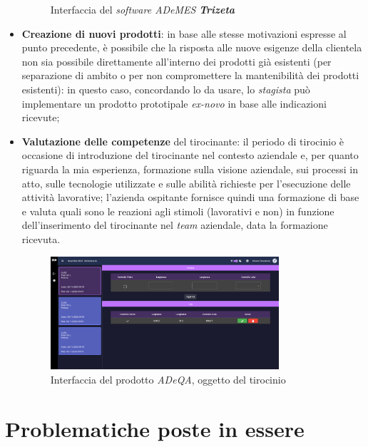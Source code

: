\begin{itemize}
\begin{figure}[H]
            \vspace{-20mm}
            \caption[Interfaccia del \textit{software ADeMES}]{Interfaccia del \textit{software ADeMES} \textit{\textbf{Trizeta}}\footnotemark}
        \end{figure}
    \item \textbf{Creazione di nuovi prodotti}: in base alle stesse motivazioni espresse al punto precedente, è possibile che la risposta alle nuove esigenze della clientela non sia possibile direttamente all'interno dei prodotti già esistenti (per separazione di ambito o
        per non compromettere la mantenibilità dei prodotti esistenti): in questo caso, concordando lo  da usare, lo \textit{stagista} può implementare un prodotto prototipale \textit{ex-novo} in base alle indicazioni ricevute;
    \item \textbf{Valutazione delle competenze} del tirocinante: il periodo di tirocinio è occasione di introduzione del tirocinante nel contesto aziendale e, per quanto riguarda la mia esperienza, formazione sulla visione aziendale, sui processi in atto, sulle tecnologie utilizzate
        e sulle abilità richieste per l'esecuzione delle attività lavorative; l'azienda ospitante fornisce quindi una formazione di base e valuta quali sono le reazioni agli stimoli (lavorativi e non) in funzione dell'inserimento del tirocinante nel \textit{team} aziendale, data la formazione ricevuta.
        \begin{figure}[H]
            \centering
            \includegraphics[width=0.8\textwidth]{images/dashboard.png}
            \caption[Interfaccia del prodotto \textit{ADeQA}]{Interfaccia del prodotto \textit{ADeQA}, oggetto del tirocinio}
        \end{figure}
\end{itemize}
\section{Problematiche poste in essere}

